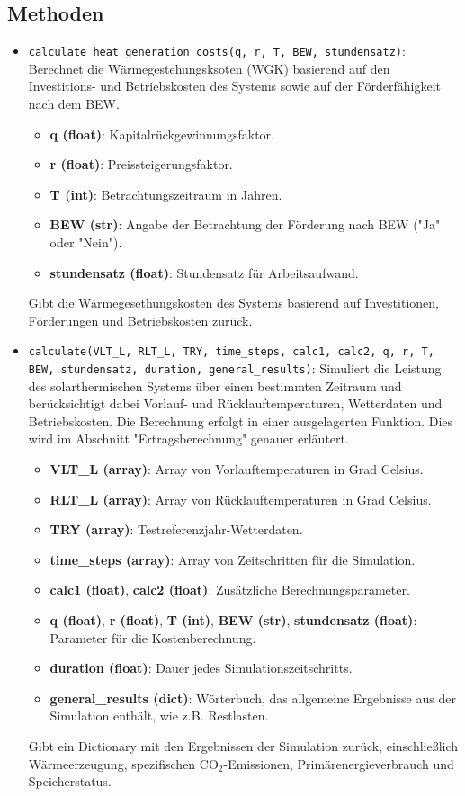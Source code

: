 \subsection{Methoden}
\begin{itemize}
    \item \texttt{calculate\_heat\_generation\_costs(q, r, T, BEW, stundensatz)}: Berechnet die Wärmegestehungsksoten (WGK) basierend auf den Investitions- und Betriebskosten des Systems sowie auf der Förderfähigkeit nach dem BEW.
    \begin{itemize}
        \item \textbf{q (float)}: Kapitalrückgewinnungsfaktor.
        \item \textbf{r (float)}: Preissteigerungsfaktor.
        \item \textbf{T (int)}: Betrachtungszeitraum in Jahren.
        \item \textbf{BEW (str)}: Angabe der Betrachtung der Förderung nach BEW ("Ja" oder "Nein").
        \item \textbf{stundensatz (float)}: Stundensatz für Arbeitsaufwand.
    \end{itemize}
    Gibt die Wärmegesethungskosten des Systems basierend auf Investitionen, Förderungen und Betriebskosten zurück.

    \item \texttt{calculate(VLT\_L, RLT\_L, TRY, time\_steps, calc1, calc2, q, r, T, BEW, stundensatz, duration, general\_results)}: 
    Simuliert die Leistung des solarthermischen Systems über einen bestimmten Zeitraum und berücksichtigt dabei Vorlauf- und Rücklauftemperaturen, Wetterdaten und Betriebskosten. Die Berechnung erfolgt in einer ausgelagerten Funktion. Dies wird im Abschnitt "Ertragsberechnung" genauer erläutert.
    \begin{itemize}
        \item \textbf{VLT\_L (array)}: Array von Vorlauftemperaturen in Grad Celsius.
        \item \textbf{RLT\_L (array)}: Array von Rücklauftemperaturen in Grad Celsius.
        \item \textbf{TRY (array)}: Testreferenzjahr-Wetterdaten.
        \item \textbf{time\_steps (array)}: Array von Zeitschritten für die Simulation.
        \item \textbf{calc1 (float)}, \textbf{calc2 (float)}: Zusätzliche Berechnungsparameter.
        \item \textbf{q (float)}, \textbf{r (float)}, \textbf{T (int)}, \textbf{BEW (str)}, \textbf{stundensatz (float)}: Parameter für die Kostenberechnung.
        \item \textbf{duration (float)}: Dauer jedes Simulationszeitschritts.
        \item \textbf{general\_results (dict)}: Wörterbuch, das allgemeine Ergebnisse aus der Simulation enthält, wie z.B. Restlasten.
    \end{itemize}
    Gibt ein Dictionary mit den Ergebnissen der Simulation zurück, einschließlich Wärmeerzeugung, spezifischen CO$_2$-Emissionen, Primärenergieverbrauch und Speicherstatus.


\end{itemize}
